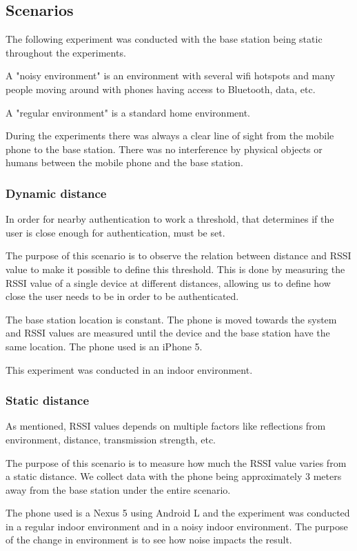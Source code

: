 
\subsection{Scenarios}

The following experiment was conducted with the base station being static throughout the experiments.

A "noisy environment" is an environment with several wifi hotspots and many people moving around with phones having access to Bluetooth, data, etc.

A "regular environment" is a standard home environment.

During the experiments there was always a clear line of sight from the mobile phone to the base station. There was no interference by physical objects or humans between the mobile phone and the base station.


\subsubsection{Dynamic distance}
\label{section:MovingTowardsSystem}
In order for nearby authentication to work a threshold, that determines if the user is close enough for authentication, must be set.

The purpose of this scenario is to observe the relation between distance and RSSI value to make it possible to  define  this threshold. This is done by measuring the RSSI value of a single device at different distances, allowing us to define how close the user needs to be in order to be authenticated.

The base station location is constant. The phone is moved towards the system and RSSI values are measured until the device and the base station have the same location. The phone used is an iPhone 5.

This experiment was conducted in an indoor environment.


\subsubsection{Static distance}
\label{section:MovingTowardsSystem}
As mentioned, RSSI values depends on multiple factors like reflections from environment, distance, transmission strength, etc. 

The purpose of this scenario is to measure how much the RSSI value varies from a static distance. We collect data with the phone being approximately 3 meters away from the base station under the entire scenario.

The phone used is a Nexus 5 using Android L and the experiment was conducted in a regular indoor environment and in a noisy indoor environment. The purpose of the change in environment is to see how noise impacts the result.


